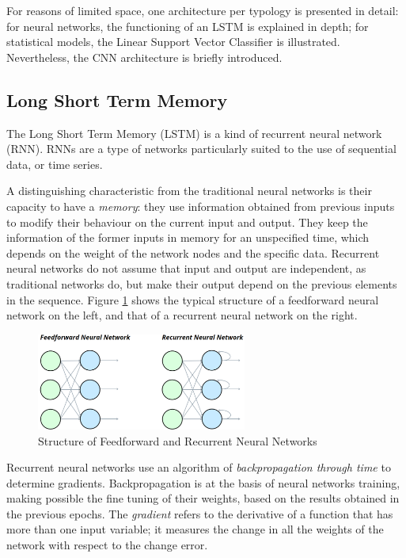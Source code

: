 \documentclass[letterpaper,11pt]{article}
\begin{document}
For reasons of limited space, one architecture per typology is presented in detail: for neural networks, the functioning of an LSTM is explained in depth; for statistical models, the Linear Support Vector Classifier is illustrated. Nevertheless, the CNN architecture is briefly introduced.

\subsection{Long Short Term Memory}

The Long Short Term Memory (LSTM) is a kind of recurrent neural network (RNN). RNNs are a type of networks particularly suited to the use of sequential data, or time series. 

A distinguishing characteristic from the traditional neural networks is their capacity to have a \textit{memory}: they use information obtained from previous inputs to modify their behaviour on the current input and output. They keep the information of the former inputs in memory for an unspecified time, which depends on the weight of the network nodes and the specific data. Recurrent neural networks do not assume that input and output are independent, as traditional networks do, but make their output depend on the previous elements in the sequence. Figure \ref{figure:fnn_vs_rnn} shows the typical structure of a feedforward neural network on the left, and that of a recurrent neural network on the right.

\vspace{0.25cm}
\begin{figure}[H]
  \centering
  \includegraphics[width=6.9cm]{feedforward_vs_recurrent_nn.png}
  \caption{Structure of Feedforward and Recurrent Neural Networks}
  \label{figure:fnn_vs_rnn}
\end{figure}

Recurrent neural networks use an algorithm of \textit{backpropagation through time} to determine gradients. Backpropagation is at the basis of neural networks training, making possible the fine tuning of their weights, based on the results obtained in the previous epochs. The \textit{gradient} refers to the derivative of a function that has more than one input variable; it measures the change in all the weights of the network with respect to the change error. 
\end{document}
